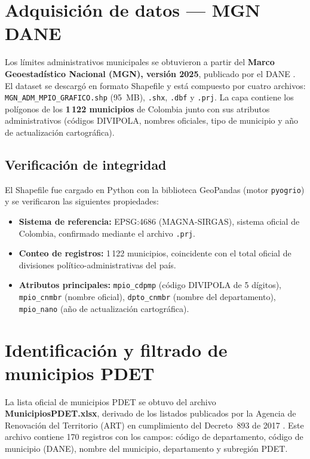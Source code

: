\documentclass[12pt, a4paper]{report}
\begin{document}
\section{Adquisición de datos — MGN DANE}

Los límites administrativos municipales se obtuvieron a partir del
\textbf{Marco Geoestadístico Nacional (MGN), versión 2025}, publicado por
el DANE \parencite{dane2025mgn}. El dataset se descargó en formato
Shapefile y está compuesto por cuatro archivos:
\texttt{MGN\_ADM\_MPIO\_GRAFICO.shp} (95~MB),
\texttt{.shx}, \texttt{.dbf} y \texttt{.prj}.
La capa contiene los polígonos de los \textbf{1\,122 municipios} de Colombia
junto con sus atributos administrativos (códigos DIVIPOLA, nombres oficiales,
tipo de municipio y año de actualización cartográfica).

\subsection{Verificación de integridad}

El Shapefile fue cargado en Python con la biblioteca GeoPandas (motor
\texttt{pyogrio}) y se verificaron las siguientes propiedades:

\begin{itemize}
  \item \textbf{Sistema de referencia:} EPSG:4686 (MAGNA-SIRGAS),
        sistema oficial de Colombia, confirmado mediante el archivo \texttt{.prj}.
  \item \textbf{Conteo de registros:} 1\,122 municipios, coincidente con el
        total oficial de divisiones político-administrativas del país.
  \item \textbf{Atributos principales:} \texttt{mpio\_cdpmp} (código DIVIPOLA
        de 5 dígitos), \texttt{mpio\_cnmbr} (nombre oficial),
        \texttt{dpto\_cnmbr} (nombre del departamento),
        \texttt{mpio\_nano} (año de actualización cartográfica).
\end{itemize}

\section{Identificación y filtrado de municipios PDET}

La lista oficial de municipios PDET se obtuvo del archivo
\textbf{MunicipiosPDET.xlsx}, derivado de los listados publicados por la
Agencia de Renovación del Territorio (ART) en cumplimiento del
Decreto~893 de 2017 \parencite{decreto893_2017}.
Este archivo contiene 170 registros con los campos: código de departamento,
código de municipio (DANE), nombre del municipio, departamento y subregión PDET.
\end{document}
